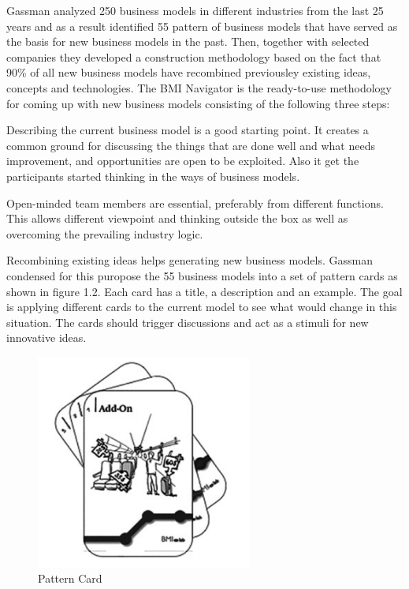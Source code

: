 	Gassman analyzed 250 business models in different industries from the last 25 years and as a result identified 55 pattern of business models that have served as the basis for new business models in the past. Then, together with selected companies they developed a construction methodology based on the fact that 90\% of all new business models have recombined previousley existing ideas, concepts and  technologies. The BMI Navigator is the ready-to-use methodology for coming up with new business models consisting of the following three steps:
				
	Describing the current business model is a good starting point. It creates a common ground for discussing the things that are done well and what needs improvement, and opportunities are open to be exploited. Also it get the participants started thinking in the ways of business models.

	Open-minded team members are essential, preferably from different functions. This allows different viewpoint and thinking outside the box as well as overcoming the prevailing industry logic.
	
	Recombining existing ideas helps generating new business models. Gassman condensed for this puropose the 55 business models into a set of pattern cards as shown in figure 1.2. Each card has a title, a description and an example. The goal is applying different cards to the current model to see what would change in this situation. The cards should trigger discussions and act as a stimuli for new innovative ideas.
	\begin{figure}[ht]
		    \begin{center}
		    \includegraphics[scale=0.6]{Talk11/Figure2.png}
		    \end{center}
		    \caption{Pattern Card}
		    \label{Pattern Card}
		\end{figure}


